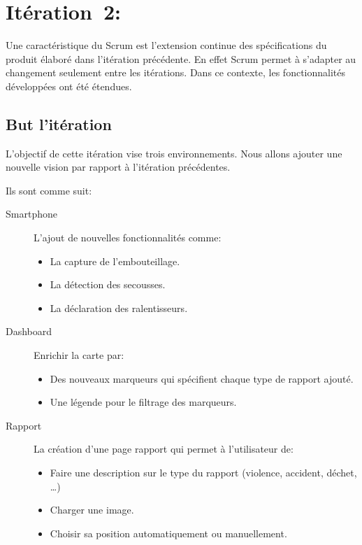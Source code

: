 \chapter[Itération~2:~(~3/8/2017~-~3/28/2017~)]{Itération~2:~\textup{}}


Une caractéristique du Scrum est l'extension continue des spécifications du
produit élaboré dans l'itération précédente. En effet Scrum permet à s'adapter
au changement seulement entre les itérations. Dans ce contexte, les
fonctionnalités développées ont été étendues.

\section{But l'itération}

L'objectif de cette itération vise trois environnements. Nous allons ajouter
une nouvelle vision par rapport à l'itération précédentes.

Ils sont comme suit:

\begin{description}
    \item [Smartphone] L'ajout de nouvelles fonctionnalités comme:
        \begin{itemize}
            \item La capture de l'embouteillage.
            \item La détection des secousses.
            \item La déclaration des ralentisseurs.
        \end{itemize}
    \item [Dashboard] Enrichir la carte par:
        \begin{itemize}
            \item Des nouveaux marqueurs qui spécifient chaque type de rapport
                ajouté.
            \item Une légende pour le filtrage des marqueurs.
        \end{itemize}
    \item [Rapport] La création d'une page rapport qui permet à l'utilisateur
        de:
        \begin{itemize}
            \item Faire une description sur le type du rapport (violence,
                accident, déchet, \ldots)
            \item Charger une image.
            \item Choisir sa position automatiquement ou manuellement.
        \end{itemize}
\end{description}


